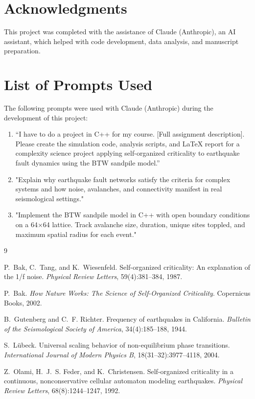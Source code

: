 \documentclass[12pt,a4paper]{article}
\begin{document}
\section*{Acknowledgments}

This project was completed with the assistance of Claude (Anthropic),
an AI assistant, which helped with code development, data analysis,
and manuscript preparation.

\section*{List of Prompts Used}

The following prompts were used with Claude (Anthropic) during the
development of this project:
\begin{enumerate}
    \item ``I have to do a project in C++ for my course. [Full assignment
          description]. Please create the simulation code, analysis scripts,
          and LaTeX report for a complexity science project applying
          self-organized criticality to earthquake fault dynamics using the
          BTW sandpile model.''
          \item "Explain why earthquake fault networks satisfy the criteria for complex systems and how noise, avalanches, and connectivity manifest in real seismological settings."
          \item "Implement the BTW sandpile model in C++ with open boundary conditions on a 64×64 lattice. Track avalanche size, duration, unique sites toppled, and maximum spatial radius for each event."
\end{enumerate}


\begin{thebibliography}{9}

P.~Bak, C.~Tang, and K.~Wiesenfeld.
\newblock Self-organized criticality: An explanation of the 1/f noise.
\newblock \textit{Physical Review Letters}, 59(4):381--384, 1987.

P.~Bak.
\newblock \textit{How Nature Works: The Science of Self-Organized Criticality}.
\newblock Copernicus Books, 2002.

B.~Gutenberg and C.~F. Richter.
\newblock Frequency of earthquakes in California.
\newblock \textit{Bulletin of the Seismological Society of America},
  34(4):185--188, 1944.

S.~L{\"u}beck.
\newblock Universal scaling behavior of non-equilibrium phase transitions.
\newblock \textit{International Journal of Modern Physics B},
  18(31--32):3977--4118, 2004.

Z.~Olami, H.~J.~S. Feder, and K.~Christensen.
\newblock Self-organized criticality in a continuous, nonconservative cellular
  automaton modeling earthquakes.
\newblock \textit{Physical Review Letters}, 68(8):1244--1247, 1992.

\end{thebibliography}
\end{document}
